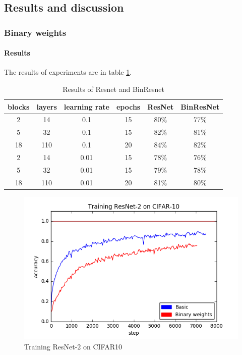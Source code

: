 \documentclass[licencjacka]{pracamgr}
\begin{document}
		\subsection{Results and discussion}
			\subsubsection{Binary weights}
		        \paragraph{Results} 
		     
		        The results of experiments are in table \ref{table:1}.
		        \begin{table}[H]
                    \caption{Results of Resnet and BinResnet}
                    \centering
                    \begin{tabular}{c c c c c c}
                    \hline\hline
                    blocks & layers & learning rate & epochs & ResNet & BinResNet  \\ [0.5ex]
                    \hline
                            2 & 14  & 0.1   & 15 & 80\% & 77\% \\
                            5 & 32  & 0.1   & 15 & 82\% & 81\% \\
                            18& 110 & 0.1   & 20 & 84\% & 82\%\\
                    \hline
                            2 & 14  & 0.01  & 15 & 78\% & 76\% \\
                            5 & 32  & 0.01  & 15 & 79\% & 78\% \\
                            18 & 110 & 0.01 & 20 & 81\% & 80\% \\
                    \hline
                    \end{tabular}
                    \label{table:1}
	            \end{table}
	            \begin{figure}[h]
				\centering
				\caption{Training ResNet-2 on CIFAR10}
				\includegraphics[width=\textwidth]{images/ResNet-2-training}
			\end{figure}
\end{document}
